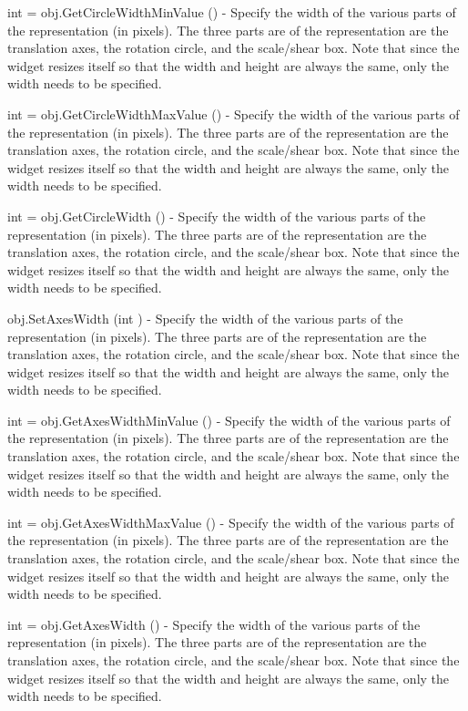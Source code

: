 \begin{DoxyItemize}
\item {\ttfamily int = obj.\-Get\-Circle\-Width\-Min\-Value ()} -\/ Specify the width of the various parts of the representation (in pixels). The three parts are of the representation are the translation axes, the rotation circle, and the scale/shear box. Note that since the widget resizes itself so that the width and height are always the same, only the width needs to be specified.  
\item {\ttfamily int = obj.\-Get\-Circle\-Width\-Max\-Value ()} -\/ Specify the width of the various parts of the representation (in pixels). The three parts are of the representation are the translation axes, the rotation circle, and the scale/shear box. Note that since the widget resizes itself so that the width and height are always the same, only the width needs to be specified.  
\item {\ttfamily int = obj.\-Get\-Circle\-Width ()} -\/ Specify the width of the various parts of the representation (in pixels). The three parts are of the representation are the translation axes, the rotation circle, and the scale/shear box. Note that since the widget resizes itself so that the width and height are always the same, only the width needs to be specified.  
\item {\ttfamily obj.\-Set\-Axes\-Width (int )} -\/ Specify the width of the various parts of the representation (in pixels). The three parts are of the representation are the translation axes, the rotation circle, and the scale/shear box. Note that since the widget resizes itself so that the width and height are always the same, only the width needs to be specified.  
\item {\ttfamily int = obj.\-Get\-Axes\-Width\-Min\-Value ()} -\/ Specify the width of the various parts of the representation (in pixels). The three parts are of the representation are the translation axes, the rotation circle, and the scale/shear box. Note that since the widget resizes itself so that the width and height are always the same, only the width needs to be specified.  
\item {\ttfamily int = obj.\-Get\-Axes\-Width\-Max\-Value ()} -\/ Specify the width of the various parts of the representation (in pixels). The three parts are of the representation are the translation axes, the rotation circle, and the scale/shear box. Note that since the widget resizes itself so that the width and height are always the same, only the width needs to be specified.  
\item {\ttfamily int = obj.\-Get\-Axes\-Width ()} -\/ Specify the width of the various parts of the representation (in pixels). The three parts are of the representation are the translation axes, the rotation circle, and the scale/shear box. Note that since the widget resizes itself so that the width and height are always the same, only the width needs to be specified.  

\end{DoxyItemize}
